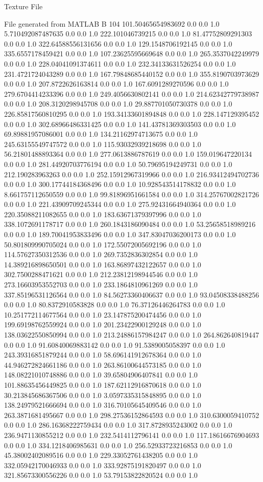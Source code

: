 Texture File 

File generated from MATLAB 
B 104
101.50465654983692	0.0	0.0	1.0
5.710492087487635	0.0	0.0	1.0
222.101046739215	0.0	0.0	1.0
81.47752809291303	0.0	0.0	1.0
322.64588556131656	0.0	0.0	1.0
129.1548706192145	0.0	0.0	1.0
335.6557178459421	0.0	0.0	1.0
107.23625595669648	0.0	0.0	1.0
265.3537042249979	0.0	0.0	1.0
228.04041091374611	0.0	0.0	1.0
232.34133631526254	0.0	0.0	1.0
231.4721724043289	0.0	0.0	1.0
167.79848685440152	0.0	0.0	1.0
355.8190703973629	0.0	0.0	1.0
207.8722626163814	0.0	0.0	1.0
167.6091289270596	0.0	0.0	1.0
279.6704414233396	0.0	0.0	1.0
249.4056630802141	0.0	0.0	1.0
214.62342779738987	0.0	0.0	1.0
208.3120298945708	0.0	0.0	1.0
29.887701050730378	0.0	0.0	1.0
226.85817560810295	0.0	0.0	1.0
193.34133601894848	0.0	0.0	1.0
228.147129395452	0.0	0.0	1.0
302.68966486331425	0.0	0.0	1.0
141.43781369303503	0.0	0.0	1.0
69.89881957086001	0.0	0.0	1.0
134.21162974713675	0.0	0.0	1.0
245.63155549747572	0.0	0.0	1.0
115.93032939218698	0.0	0.0	1.0
56.21801488893364	0.0	0.0	1.0
277.0613886787619	0.0	0.0	1.0
159.019647220134	0.0	0.0	1.0
281.44920703776194	0.0	0.0	1.0
50.79695194249731	0.0	0.0	1.0
212.190283963263	0.0	0.0	1.0
252.15912967319966	0.0	0.0	1.0
216.93412494702736	0.0	0.0	1.0
300.17744184368496	0.0	0.0	1.0
10.928543514178832	0.0	0.0	1.0
8.661757112650559	0.0	0.0	1.0
99.81896951661584	0.0	0.0	1.0
314.25767002821726	0.0	0.0	1.0
221.43909709245344	0.0	0.0	1.0
275.92431664940364	0.0	0.0	1.0
220.35088211082655	0.0	0.0	1.0
183.63671379397996	0.0	0.0	1.0
338.1072691178717	0.0	0.0	1.0
260.1843186090484	0.0	0.0	1.0
53.25658518989216	0.0	0.0	1.0
189.70041953833496	0.0	0.0	1.0
347.83047036200173	0.0	0.0	1.0
50.801809990705024	0.0	0.0	1.0
172.55072005692196	0.0	0.0	1.0
114.57627350312536	0.0	0.0	1.0
269.7352836302854	0.0	0.0	1.0
14.389216898650501	0.0	0.0	1.0
163.86897432122657	0.0	0.0	1.0
302.7500288471621	0.0	0.0	1.0
212.23812198944546	0.0	0.0	1.0
273.16603953552703	0.0	0.0	1.0
233.1864810961269	0.0	0.0	1.0
337.85196531126564	0.0	0.0	1.0
84.56273360406637	0.0	0.0	1.0
93.04508338488256	0.0	0.0	1.0
80.8372910583828	0.0	0.0	1.0
76.37126446264783	0.0	0.0	1.0
10.251772114677564	0.0	0.0	1.0
23.147875200474456	0.0	0.0	1.0
199.69198762559924	0.0	0.0	1.0
201.23422900129248	0.0	0.0	1.0
138.03622550850994	0.0	0.0	1.0
213.24886157984247	0.0	0.0	1.0
264.862640819447	0.0	0.0	1.0
91.60840069883142	0.0	0.0	1.0
91.5389005058397	0.0	0.0	1.0
243.39316851879244	0.0	0.0	1.0
58.696141912678364	0.0	0.0	1.0
44.946272824661186	0.0	0.0	1.0
263.86100644573185	0.0	0.0	1.0
148.08221010748886	0.0	0.0	1.0
39.65804906407841	0.0	0.0	1.0
101.88635456449825	0.0	0.0	1.0
187.62112916870618	0.0	0.0	1.0
30.213845686367506	0.0	0.0	1.0
3.0597335315848895	0.0	0.0	1.0
138.24979521666694	0.0	0.0	1.0
316.70105645409546	0.0	0.0	1.0
263.3871681495667	0.0	0.0	1.0
298.27536152864593	0.0	0.0	1.0
310.6300059410752	0.0	0.0	1.0
286.16368222759434	0.0	0.0	1.0
317.8728935243002	0.0	0.0	1.0
236.9471130855212	0.0	0.0	1.0
232.5414112796141	0.0	0.0	1.0
117.18616676904693	0.0	0.0	1.0
334.1218406985631	0.0	0.0	1.0
256.52933723216853	0.0	0.0	1.0
45.38002402089516	0.0	0.0	1.0
229.33052761438205	0.0	0.0	1.0
332.05942170046933	0.0	0.0	1.0
333.92875191820497	0.0	0.0	1.0
321.85673300556226	0.0	0.0	1.0
53.79153822820524	0.0	0.0	1.0

